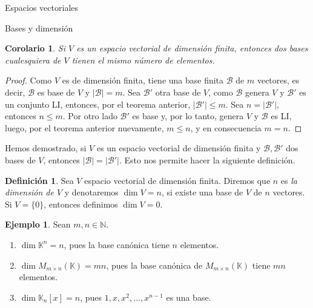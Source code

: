 \documentclass[a4paper,12pt,twoside,spanish,reqno]{amsbook}
\newtheorem{corolario}[teorema]{Corolario}
\theoremstyle{definition}
\newtheorem{definicion}{Definici\'on}[section]
\newtheorem{ejemplo}{Ejemplo}[section]
\theoremstyle{remark}
\newcommand{\K}{\mathbb K}
\begin{document}
\begin{chapter}{Espacios vectoriales}
\begin{section}{Bases y dimensión}
\begin{corolario}
    Si $V$ es un espacio vectorial de dimensión finita, entonces dos bases cualesquiera de $V$ tienen el mismo número de elementos.
\end{corolario}
\begin{proof}
        Como $V$ es de dimensión finita, tiene una base finita $\mathcal B$  de $m$ vectores, es decir,  $\mathcal B$ es base de $V$ y  $|\mathcal B| = m.$
        Sea $\mathcal B'$  otra base de $V$, como $\mathcal B$  genera $V$ y  $\mathcal B'$ es  un conjunto LI, entonces, por el teorema anterior, $|\mathcal B'| \le m$. Sea $n = |\mathcal B'|$,  entonces $n \le m$. Por otro lado $\mathcal B'$ es base y, por lo tanto,  genera $V$ y  $\mathcal B$ es LI, luego, por el teorema anterior nuevamente,  $m \le n$, y en consecuencia $m=n$.
\end{proof}

Hemos demostrado, si $V$  es un espacio vectorial de dimensión finita y $\mathcal B,\mathcal B' $ dos bases de $V$,  entonces $|\mathcal B|=|\mathcal B'|$. Esto nos permite hacer la siguiente definición. 


\begin{definicion}
    Sea $V$ espacio vectorial de dimensión finita. Diremos que $n$  es \textit{la dimensión de $V$} y  denotaremos $\dim V =n$,  si existe una base de $V$  de $n$  vectores. Si $V = \{0\}$,  entonces definimos $\dim V =0$.
\end{definicion}





\begin{ejemplo} Sean $m,n \in \mathbb N$. 
    \begin{enumerate}
        \item $\dim \K^n= n$, pues  la base canónica tiene $n$ elementos.
        \item $\dim M_{m \times n}(\K) = mn$, pues la base canónica de $M_{m \times n}(\K)$ tiene $mn$  elementos.  
        \item $\dim \K_n[x] =n$, pues $1,x,x^2,\ldots,x^{n-1}$ es una base.   
    \end{enumerate}
\end{ejemplo}
        

\end{section}
\end{chapter}
\end{document}
